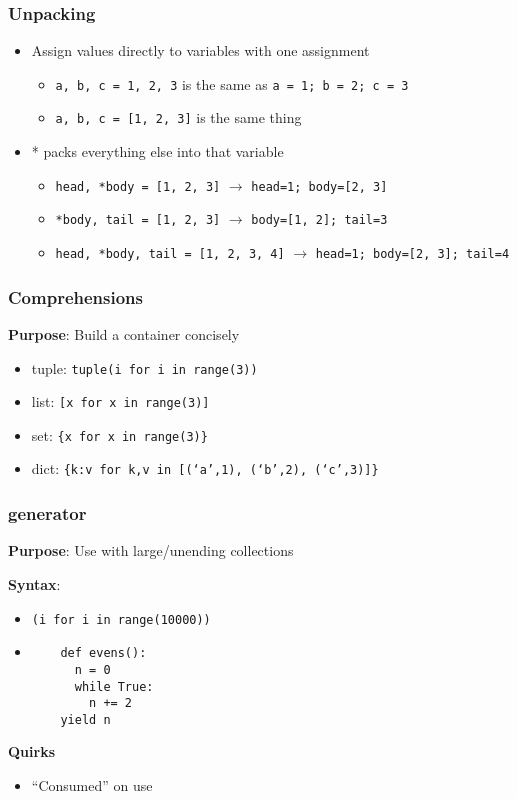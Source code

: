 \documentclass{beamer}
\begin{document}
\begin{frame}
  \frametitle{Unpacking}

  \begin{itemize}
  \item Assign values directly to variables with one assignment
    \begin{itemize}
      \item \texttt{a, b, c = 1, 2, 3} is the same as \texttt{a = 1; b = 2; c = 3}
      \item \texttt{a, b, c = [1, 2, 3]} is the same thing
     \end{itemize}
  \item * packs everything else into that variable
    \begin{itemize}
      \item \texttt{head, *body = [1, 2, 3]} $\rightarrow$ \texttt{head=1; body=[2, 3]}
      \item \texttt{*body, tail = [1, 2, 3]} $\rightarrow$ \texttt{body=[1, 2]; tail=3}
      \item \texttt{head, *body, tail = [1, 2, 3, 4]} $\rightarrow$ \texttt{head=1; body=[2, 3]; tail=4}
     \end{itemize}
  \end{itemize}
\end{frame}

\begin{frame}
  \frametitle{Comprehensions}

  \textbf{Purpose}: Build a container concisely

  \begin{itemize}
    \item tuple: \texttt{tuple(i for i in range(3))}
    \item list: \texttt{[x for x in range(3)]}
    \item set: \texttt{\{x for x in range(3)\}}
    \item dict: \texttt{\{k:v for k,v in [(`a',1), (`b',2), (`c',3)]\}}
  \end{itemize}

\end{frame}

\begin{frame}[fragile]
  \frametitle{generator}
 
  \textbf{Purpose}: Use with large/unending collections 

  \textbf{Syntax}: 
  \begin{itemize}
  \item \texttt{(i for i in range(10000))}

  \item 

  \begin{lstlisting}
    def evens():
      n = 0
      while True:
        n += 2
	yield n
  \end{lstlisting}

  \end{itemize}

  \textbf{Quirks}
  \begin{itemize}
    \item ``Consumed'' on use
  \end{itemize}
\end{frame}
\end{document}
